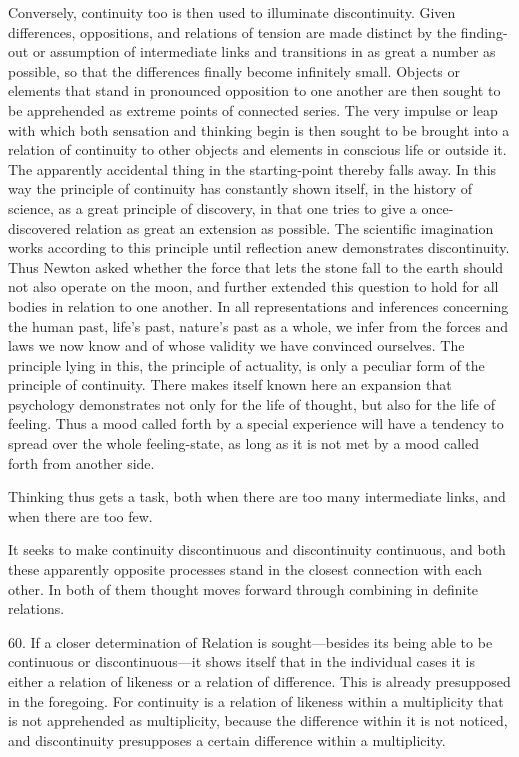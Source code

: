 \documentclass[12pt,a4paper]{book}
\newcommand{\opage}[1]{\marginnote{\footnotesize\textit{[#1]}}}
\begin{document}
Conversely, continuity too is then used to illuminate discontinuity. Given
differences, oppositions, and relations of tension are made distinct by the
finding-out or assumption of intermediate links and transitions in as great
a number as possible, so that the differences finally become infinitely
small. Objects or elements that stand in pronounced opposition to one
another are then sought to be apprehended as extreme points of connected
series. The very impulse or leap with which both sensation and thinking
begin is then sought to be brought into a relation of continuity to other
objects and elements in conscious life or outside it. The apparently
accidental thing in the starting-point thereby falls away. In this way the
principle of continuity has constantly shown itself, in the history of
science, as a great principle of discovery, in that one tries to give a
once-discovered relation as great an extension as possible. The scientific
imagination works according to this principle until reflection anew
demonstrates discontinuity. Thus Newton asked whether the force that lets
the stone fall to the earth should not also operate on the moon, and further
extended this question to hold for all bodies in relation to one another. In
all representations and inferences concerning the human past, life's past,
nature's past as a whole, we infer from the forces and laws we now know and
of whose validity we have convinced ourselves. The principle lying in this,
the principle of actuality, is only a peculiar form of the principle of
continuity. There makes itself known here an expansion that psychology
demonstrates not only for the life of thought, but also for the life of
feeling. Thus a mood called forth by a special experience will have a
tendency to spread over the whole feeling-state, as long as it is not met by
a mood called forth from another side.

Thinking thus gets a task, both when there are too many intermediate links,
and when there are too few.

\opage{160}It seeks to make continuity discontinuous and discontinuity continuous, and
both these apparently opposite processes stand in the closest connection with
each other. In both of them thought moves forward through combining in
definite relations.

60. If a closer determination of Relation is sought---besides its being able
to be continuous or discontinuous---it shows itself that in the individual
cases it is either a relation of likeness or a relation of difference. This
is already presupposed in the foregoing. For continuity is a relation of
likeness within a multiplicity that is not apprehended as multiplicity,
because the difference within it is not noticed, and discontinuity
presupposes a certain difference within a multiplicity.
\end{document}
